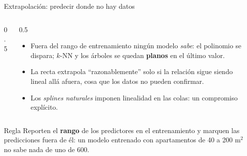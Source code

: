 \documentclass{beamer}
\newcommand{\1}{\mathbb{I}}
\begin{document}
\begin{frame}{Extrapolación: predecir donde no hay datos}
\small
\begin{columns}[T]
\begin{column}{0.5\textwidth}
\begin{center}
\end{center}
\end{column}
\begin{column}{0.5\textwidth}
\vspace{0.1cm}
\begin{itemize}\itemsep4pt
  \item Fuera del rango de entrenamiento ningún modelo \emph{sabe}: el polinomio se dispara; $k$-NN y los árboles se quedan \textbf{planos} en el último valor.
  \item La recta extrapola ``razonablemente'' solo si la relación sigue siendo lineal allá afuera, cosa que los datos no pueden confirmar.
  \item Los \emph{splines naturales} imponen linealidad en las colas: un compromiso explícito.
\end{itemize}
\end{column}
\end{columns}
\pause
\vspace{0.15cm}
\begin{block}{Regla}
Reporten el \textbf{rango} de los predictores en el entrenamiento y marquen las predicciones fuera de él: un modelo entrenado con apartamentos de 40 a 200 m$^2$ no sabe nada de uno de 600.
\end{block}
\end{frame}
\end{document}
